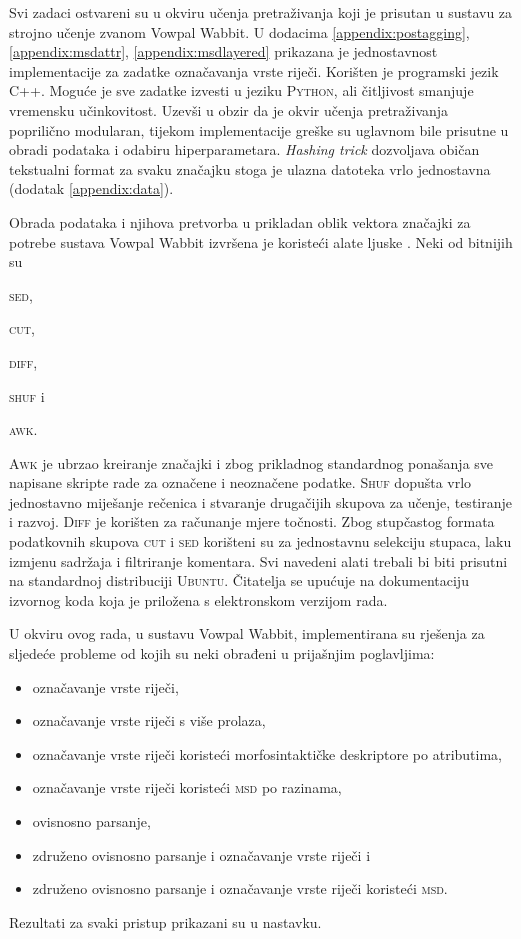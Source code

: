 Svi zadaci ostvareni su u okviru učenja pretraživanja koji je prisutan u
sustavu za strojno učenje zvanom Vowpal Wabbit. U dodacima
\ref{appendix:postagging}, \ref{appendix:msdattr}, \ref{appendix:msdlayered}
prikazana je jednostavnost implementacije za zadatke označavanja vrste riječi.
Korišten je programski jezik \textsc{C++}. Moguće je sve zadatke izvesti u
jeziku \textsc{Python}, ali čitljivost smanjuje vremensku
učinkovitost. Uzevši u obzir da je okvir učenja pretraživanja poprilično
modularan, tijekom implementacije greške su uglavnom bile prisutne u
obradi podataka i odabiru hiperparametara. \textit{Hashing trick} dozvoljava
običan tekstualni format za svaku značajku stoga je ulazna datoteka vrlo
jednostavna (dodatak \ref{appendix:data}).

Obrada podataka i njihova pretvorba u prikladan oblik vektora značajki za
potrebe sustava Vowpal Wabbit izvršena je koristeći alate ljuske .
Neki od  bitnijih su
\begin{inlinelist}
  \item \textsc{sed},
  \item \textsc{cut},
  \item \textsc{diff},
  \item \textsc{shuf} i
  \item \textsc{awk}.
\end{inlinelist}
\textsc{Awk} je ubrzao kreiranje značajki i zbog prikladnog standardnog
ponašanja sve napisane skripte rade za označene i neoznačene podatke.
\textsc{Shuf} dopušta vrlo jednostavno miješanje rečenica i stvaranje drugačijih
skupova za učenje, testiranje i razvoj. \textsc{Diff} je korišten za računanje
mjere točnosti. Zbog stupčastog formata podatkovnih skupova \textsc{cut} i
\textsc{sed} korišteni su za jednostavnu selekciju stupaca, laku izmjenu
sadržaja i filtriranje komentara. Svi navedeni alati trebali bi biti prisutni na
standardnoj distribuciji \textsc{Ubuntu}. Čitatelja se upućuje na dokumentaciju
izvornog koda koja je priložena s elektronskom verzijom rada.

U okviru ovog rada, u sustavu Vowpal Wabbit, implementirana su rješenja za
sljedeće probleme od kojih su neki obrađeni u prijašnjim poglavljima:
\begin{itemize}
  \item označavanje vrste riječi,
  \item označavanje vrste riječi s više prolaza,
  \item označavanje vrste riječi koristeći morfosintaktičke deskriptore
   po atributima,
  \item označavanje vrste riječi koristeći \textsc{msd} po
  razinama,
  \item ovisnosno parsanje,
  \item združeno ovisnosno parsanje i označavanje vrste riječi i
  \item združeno ovisnosno parsanje i označavanje vrste riječi koristeći
  \textsc{msd}.
\end{itemize}
Rezultati za svaki pristup prikazani su u nastavku.

